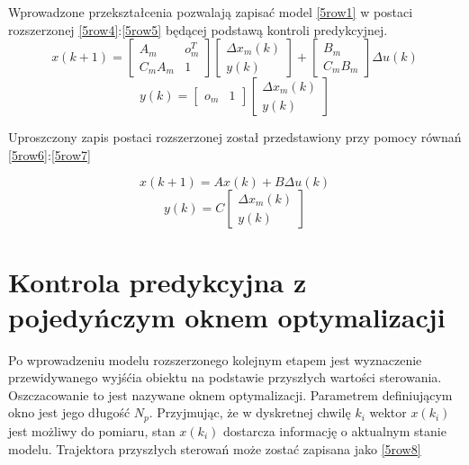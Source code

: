 Wprowadzone przekształcenia pozwalają zapisać model \ref{5row1} w postaci rozszerzonej \ref{5row4}:\ref{5row5} będącej podstawą kontroli predykcyjnej. 
\begin{equation}
\label{5row4} 
x(k+1)=\begin{bmatrix}	A_m & o^T_m  \\	C_mA_m & 1 \end{bmatrix}
\begin{bmatrix}	\Delta x_m(k) \\y(k) \end{bmatrix}+
\begin{bmatrix}	B_m \\ C_mB_m \end{bmatrix} \Delta u(k)
\end{equation}
\begin{equation}
\label{5row5} 
y(k)=\begin{bmatrix}	o_m & 1 \end{bmatrix}  \begin{bmatrix} \Delta x_m(k) \\y(k) \end{bmatrix} 
\end{equation}


Uproszczony zapis postaci rozszerzonej został przedstawiony przy pomocy równań \ref{5row6}:\ref{5row7}


\begin{equation}
\label{5row6} 
x(k+1)=Ax(k)+B \Delta u(k)
\end{equation}
\begin{equation}
\label{5row7} 
y(k)=C \begin{bmatrix} \Delta x_m(k) \\y(k) \end{bmatrix} 
\end{equation}

\section{Kontrola predykcyjna z pojedyńczym oknem optymalizacji}

Po wprowadzeniu modelu rozszerzonego kolejnym etapem jest wyznaczenie przewidywanego wyjśćia obiektu na podstawie przyszłych wartości sterowania. Oszczacowanie to jest nazywane oknem optymalizacji. Parametrem definiującym okno jest jego długość $N_p$. Przyjmując, że w dyskretnej chwilę $k_i$ wektor $x(k_i)$ jest możliwy do pomiaru, stan $x(k_i)$ dostarcza informację o aktualnym stanie modelu. Trajektora przyszłych sterowań może zostać zapisana jako \ref{5row8}

